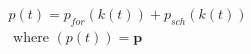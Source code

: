 \begin{equation}
\begin{split}
	p(t) = p_{for}(k(t)) + p_{sch}(k(t))\\
	\text{ where } (p(t)) = \textbf{p}
\end{split}
\label{ch2:equ:notation-simplification}
\end{equation}